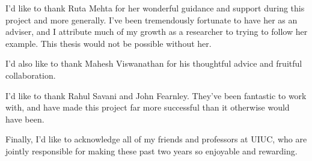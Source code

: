 I'd like to thank Ruta Mehta for her wonderful guidance and support during this project and more generally. I've been tremendously fortunate to have her as an adviser, and I attribute much of my growth as a researcher to trying to follow her example. This thesis would not be possible without her.

I'd also like to thank Mahesh Viswanathan for his thoughtful advice and fruitful collaboration.

I'd like to thank Rahul Savani and John Fearnley. They've been fantastic to work with, and have made this project far more successful than it otherwise would have been.

Finally, I'd like to acknowledge all of my friends and professors at UIUC, who are jointly responsible for making these past two years so enjoyable and rewarding.

